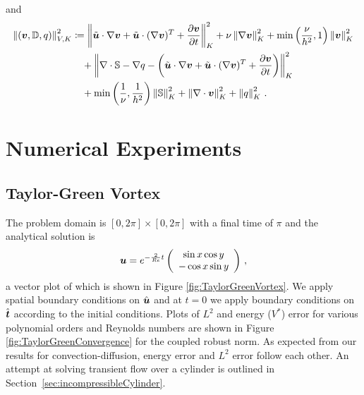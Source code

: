 \documentclass[Dissertation.tex]{subbIles}
\begin{document}
and
\begin{align*}
\left\| \left( \boldsymbol v,\mathbb{D},q \right) \right\|_{V,K}^2 &\coloneqq
\left\| \tilde{\boldsymbol u}\cdot\nabla\boldsymbol v +\tilde{\boldsymbol u}\cdot(\nabla\boldsymbol v)^T+\frac{\partial\boldsymbol v}{\partial t} \right\|_K^2
+ \nu\left\| \nabla\boldsymbol v \right\|_K^2
+ \min\left( \frac{\nu}{h^2},1 \right)\left\| \boldsymbol v \right\|^2_K
\\\nonumber&\quad
+ \left\| \nabla\cdot\mathbb{S}-\nabla q-\left( \tilde{\boldsymbol u}\cdot\nabla\boldsymbol v +\tilde{\boldsymbol u}\cdot(\nabla\boldsymbol v)^T+\frac{\partial\boldsymbol v}{\partial t} \right) \right\|_K^2
\\\nonumber&\quad
+ \min\left( \frac{1}{\nu},\frac{1}{h^2} \right)\left\| \mathbb{S} \right\|_K^2
+\left\| \nabla\cdot\boldsymbol v \right\|_K^2
+\left\| q \right\|_K^2
\,.
\end{align*}

\section{Numerical Experiments}
\subsection{Taylor-Green Vortex}
The problem domain is $[0,2\pi]\times[0,2\pi]$ with a final time of $\pi$ and the analytical solution is 
\[
\boldsymbol u=e^{-\frac{2}{Re}t}\left( \begin{array}{c} \sin{x}\cos{y}\\ -\cos{x}\sin{y}\\ \end{array} \right)\,,
\]
a vector plot of which is shown in Figure \ref{fig:TaylorGreenVortex}.
We apply spatial boundary conditions on $\hat{\boldsymbol u}$ and at $t=0$ we apply boundary conditions
on $\hat{\boldsymbol t}$ according to the initial conditions.
Plots of $L^2$ and energy ($V^*$) error for various polynomial orders and Reynolds numbers are shown
in Figure \ref{fig:TaylorGreenConvergence} for the coupled robust norm.
As expected from our results for convection-diffusion, energy error and $L^2$ error follow each other.
An attempt at solving transient flow over a cylinder is outlined in Section~\ref{sec:incompressibleCylinder}.
\end{document}
